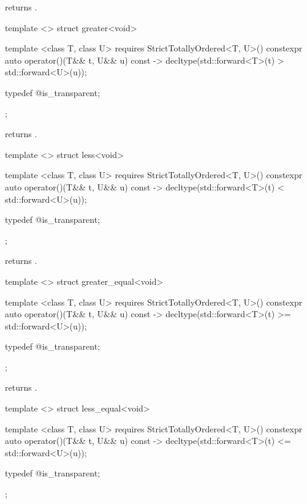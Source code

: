 \begin{itemdescr}
\pnum
{} returns .
\end{itemdescr}

%
\begin{itemdecl}
template <> struct greater<void> {
  template <class T, class U>
    requires StrictTotallyOrdered<T, U>()
  constexpr auto operator()(T&& t, U&& u) const
    -> decltype(std::forward<T>(t) > std::forward<U>(u));

  typedef @\unspec@ is_transparent;
};
\end{itemdecl}

\begin{itemdescr}
\pnum
{} returns .
\end{itemdescr}

%
\begin{itemdecl}
template <> struct less<void> {
  template <class T, class U>
    requires StrictTotallyOrdered<T, U>()
  constexpr auto operator()(T&& t, U&& u) const
    -> decltype(std::forward<T>(t) < std::forward<U>(u));

  typedef @\unspec@ is_transparent;
};
\end{itemdecl}

\begin{itemdescr}
\pnum
{} returns .
\end{itemdescr}

%
\begin{itemdecl}
template <> struct greater_equal<void> {
  template <class T, class U>
    requires StrictTotallyOrdered<T, U>()
  constexpr auto operator()(T&& t, U&& u) const
    -> decltype(std::forward<T>(t) >= std::forward<U>(u));

  typedef @\unspec@ is_transparent;
};
\end{itemdecl}

\begin{itemdescr}
\pnum
{} returns .
\end{itemdescr}

%
\begin{itemdecl}
template <> struct less_equal<void> {
  template <class T, class U>
    requires StrictTotallyOrdered<T, U>()
  constexpr auto operator()(T&& t, U&& u) const
    -> decltype(std::forward<T>(t) <= std::forward<U>(u));

  typedef @\unspec@ is_transparent;
};
\end{itemdecl}

